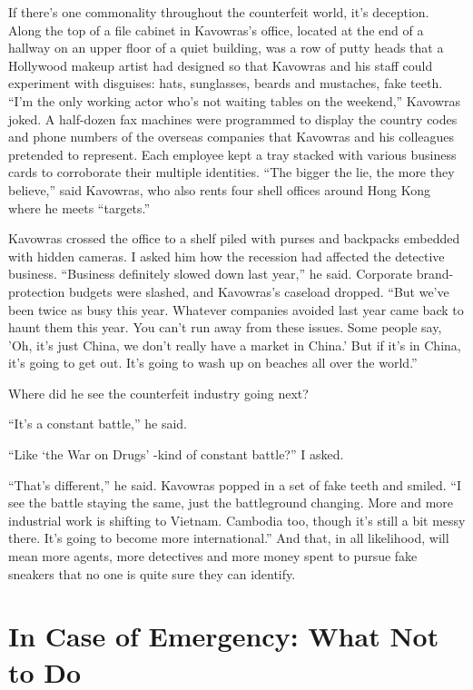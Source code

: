 ﻿\documentclass[12pt]{article}
\begin{document}
If there's one commonality throughout the counterfeit world, it's deception. Along the top of a file
cabinet in Kavowras's office, located at the end of a hallway on an upper floor of a quiet building,
was a row of putty heads that a Hollywood makeup artist had designed so that Kavowras and his staff
could experiment with disguises: hats, sunglasses, beards and mustaches, fake teeth. ``I'm the only
working actor who's not waiting tables on the weekend,'' Kavowras joked. A half-dozen fax machines
were programmed to display the country codes and phone numbers of the overseas companies that
Kavowras and his colleagues pretended to represent. Each employee kept a tray stacked with various
business cards to corroborate their multiple identities. ``The bigger the lie, the more they
believe,'' said Kavowras, who also rents four shell offices around Hong Kong where he meets
``targets.''

Kavowras crossed the office to a shelf piled with purses and backpacks embedded with hidden cameras.
I asked him how the recession had affected the detective business. ``Business definitely slowed down
last year,'' he said. Corporate brand-protection budgets were slashed, and Kavowras's caseload
dropped. ``But we've been twice as busy this year. Whatever companies avoided last year came back to
haunt them this year. You can't run away from these issues. Some people say, 'Oh, it's just China,
we don't really have a market in China.' But if it's in China, it's going to get out. It's going to
wash up on beaches all over the world.''

Where did he see the counterfeit industry going next?

``It's a constant battle,'' he said.

``Like `the War on Drugs' -kind of constant battle?'' I asked.

``That's different,'' he said. Kavowras popped in a set of fake teeth and smiled. ``I see the battle
staying the same, just the battleground changing. More and more industrial work is shifting to
Vietnam. Cambodia too, though it's still a bit messy there. It's going to become more
international.'' And that, in all likelihood, will mean more agents, more detectives and more money
spent to pursue fake sneakers that no one is quite sure they can identify.

\pagebreak
\section{In Case of Emergency: What Not to Do}
\end{document}
